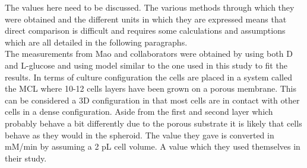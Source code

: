 \documentclass[11pt,a4paper]{article}
\begin{document}
\begin{table}[h!]
\begin{center}
\begin{tabular}{ |p{18mm}|p{26mm}|p{35mm}|p{20mm}|p{25mm}|p{7mm}| }

 
 \end{tabular}
 \end{center}
 \end{table}
The values here need to be discussed. The various methods through which they were obtained and the different units in which they are expressed means that direct comparison is difficult and requires some calculations and assumptions which are all detailed in the following paragraphs.\\
 
The measurements from Mao and collaborators were obtained by using both  D and L-glucose and using model similar to the one used in this study to fit the results. In terms of culture configuration the cells are placed in a system called the MCL where 10-12 cells layers have been grown on a porous membrane. This can be considered a 3D configuration in that most cells are in contact with other cells in a dense configuration. Aside from the first and second layer which probably behave a bit differently due to the porous substrate it is likely that cells behave as they would in the spheroid. The value they gave is converted in mM/min by assuming a 2 pL cell volume. A value which they used themselves in their study.\\
 
\end{document}
